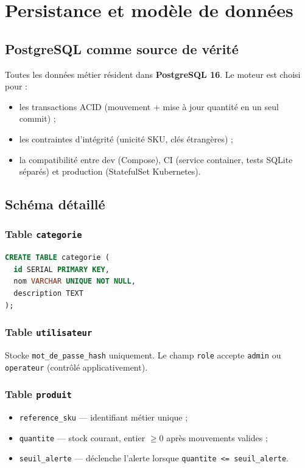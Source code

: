 \chapter{Persistance et modèle de données}
\label{ch:donnees}

\section{PostgreSQL comme source de vérité}

Toutes les données métier résident dans \textbf{PostgreSQL 16}. Le moteur est choisi pour :
\begin{itemize}
  \item les transactions ACID (mouvement + mise à jour quantité en un seul commit) ;
  \item les contraintes d'intégrité (unicité SKU, clés étrangères) ;
  \item la compatibilité entre dev (Compose), CI (service container, tests SQLite séparés) et production (StatefulSet Kubernetes).
\end{itemize}

\section{Schéma détaillé}

\subsection{Table \texttt{categorie}}

\begin{lstlisting}[language=SQL,caption={Structure logique categorie}]
CREATE TABLE categorie (
  id SERIAL PRIMARY KEY,
  nom VARCHAR UNIQUE NOT NULL,
  description TEXT
);
\end{lstlisting}

\subsection{Table \texttt{utilisateur}}

Stocke \texttt{mot\_de\_passe\_hash} uniquement. Le champ \texttt{role} accepte \texttt{admin} ou \texttt{operateur} (contrôlé applicativement).

\subsection{Table \texttt{produit}}

\begin{itemize}
  \item \texttt{reference\_sku} — identifiant métier unique ;
  \item \texttt{quantite} — stock courant, entier $\geq 0$ après mouvements valides ;
  \item \texttt{seuil\_alerte} — déclenche l'alerte lorsque \texttt{quantite <= seuil\_alerte}.
\end{itemize}

